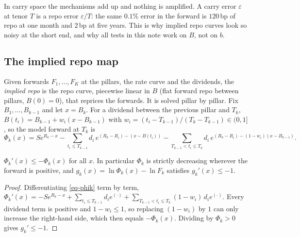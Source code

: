 \begin{insight}
In carry space the mechanisms add up and nothing is amplified. A carry error $\varepsilon$ at tenor $T$ is a repo
error $\varepsilon/T$: the same $0.1\%$ error in the forward is $120$\,bp of repo at one month and $2$\,bp at five
years. This is why implied repo curves look so noisy at the short end, and why all tests in this note work on $B$,
not on $b$.
\end{insight}

\subsection{The implied repo map}
Given forwards $F_1,\dots,F_K$ at the pillars, the rate curve and the dividends, the \emph{implied repo} is the repo
curve, piecewise linear in $B$ (flat forward repo between pillars, $B(0)=0$), that reprices the forwards. It is
solved pillar by pillar. Fix $B_1,\dots,B_{k-1}$ and let $x=B_k$. For a dividend between the previous pillar and
$T_k$, $B(t_i)=B_{k-1}+w_i(x-B_{k-1})$ with $w_i=(t_i-T_{k-1})/(T_k-T_{k-1})\in(0,1]$, so the model forward at $T_k$ is
\begin{equation}\label{eq-phik}
\Phi_k(x)=Se^{R_k-x}-\sum_{t_i\le T_{k-1}}d_i\,e^{(R_k-R_i)-(x-B(t_i))}
-\sum_{T_{k-1}<t_i\le T_k}d_i\,e^{(R_k-R_i)-(1-w_i)(x-B_{k-1})}.
\end{equation}

\begin{lemma}[Monotonicity]\label{lem-monotone}
$\Phi_k'(x)\le-\Phi_k(x)$ for all $x$. In particular $\Phi_k$ is strictly decreasing wherever the forward is positive,
and $g_k(x)=\ln\Phi_k(x)-\ln F_k$ satisfies $g_k'(x)\le-1$.
\end{lemma}
\begin{proof}
Differentiating \cref{eq-phik} term by term,
$\Phi_k'(x)=-Se^{R_k-x}+\sum_{t_i\le T_{k-1}}d_ie^{(\cdot)}+\sum_{T_{k-1}<t_i\le T_k}(1-w_i)\,d_ie^{(\cdot)}$.
Every dividend term is positive and $1-w_i\le1$, so replacing $(1-w_i)$ by $1$ can only increase the right-hand
side, which then equals $-\Phi_k(x)$. Dividing by $\Phi_k>0$ gives $g_k'\le-1$.
\end{proof}

